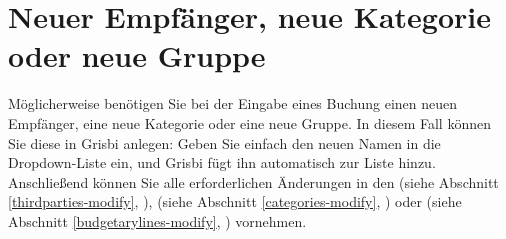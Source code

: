 \section{Neuer Empfänger, neue Kategorie oder neue Gruppe\label{transactions-fillcombo}}

Möglicherweise benötigen Sie bei der Eingabe eines Buchung einen neuen Empfänger, eine neue Kategorie oder eine neue Gruppe. In diesem Fall können Sie diese in Grisbi  anlegen: Geben Sie einfach den neuen Namen in die Dropdown-Liste ein, und Grisbi fügt ihn automatisch zur Liste hinzu. Anschließend können Sie alle erforderlichen Änderungen in den  (siehe Abschnitt \vref{thirdparties-modify}, ),  (siehe Abschnitt \vref{categories-modify}, ) oder  (siehe Abschnitt \vref{budgetarylines-modify}, ) vornehmen.

